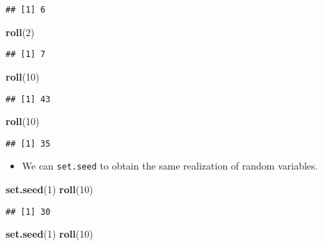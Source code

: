 \documentclass[
]{book}
\newenvironment{Shaded}{\begin{snugshade}}{\end{snugshade}}
\newcommand{\DecValTok}[1]{\textcolor[rgb]{0.00,0.00,0.81}{#1}}
\newcommand{\KeywordTok}[1]{\textcolor[rgb]{0.13,0.29,0.53}{\textbf{#1}}}
\newcommand{\NormalTok}[1]{#1}
\providecommand{\tightlist}{%
  \setlength{\itemsep}{0pt}\setlength{\parskip}{0pt}}
\begin{document}
\begin{verbatim}
## [1] 6
\end{verbatim}

\begin{Shaded}
\begin{Highlighting}[]
\KeywordTok{roll}\NormalTok{(}\DecValTok{2}\NormalTok{)}
\end{Highlighting}
\end{Shaded}

\begin{verbatim}
## [1] 7
\end{verbatim}

\begin{Shaded}
\begin{Highlighting}[]
\KeywordTok{roll}\NormalTok{(}\DecValTok{10}\NormalTok{)}
\end{Highlighting}
\end{Shaded}

\begin{verbatim}
## [1] 43
\end{verbatim}

\begin{Shaded}
\begin{Highlighting}[]
\KeywordTok{roll}\NormalTok{(}\DecValTok{10}\NormalTok{)}
\end{Highlighting}
\end{Shaded}

\begin{verbatim}
## [1] 35
\end{verbatim}

\begin{itemize}
\tightlist
\item
  We can \texttt{set.seed} to obtain the same realization of random variables.
\end{itemize}

\begin{Shaded}
\begin{Highlighting}[]
\KeywordTok{set.seed}\NormalTok{(}\DecValTok{1}\NormalTok{)}
\KeywordTok{roll}\NormalTok{(}\DecValTok{10}\NormalTok{)}
\end{Highlighting}
\end{Shaded}

\begin{verbatim}
## [1] 30
\end{verbatim}

\begin{Shaded}
\begin{Highlighting}[]
\KeywordTok{set.seed}\NormalTok{(}\DecValTok{1}\NormalTok{)}
\KeywordTok{roll}\NormalTok{(}\DecValTok{10}\NormalTok{)}
\end{Highlighting}
\end{Shaded}
\end{document}

